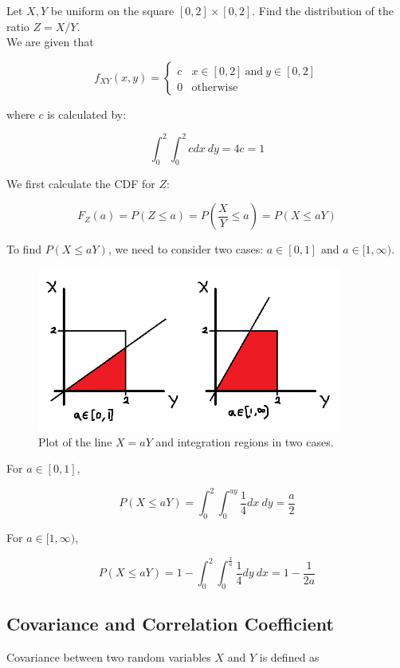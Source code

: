 \begin{texample}
	Let $X,Y$ be uniform on the square $[0,2]\times[0,2]$. Find the distribution of the ratio $Z=X/Y$. \\
	
	We are given that
	
	\[f_{XY}(x,y)=\begin{cases} c & x\in[0,2]\:\text{and}\:y\in[0,2] \\ 0 & \text{otherwise} \end{cases}\]
	
	where $c$ is calculated by:
	
	\[\int_0^2\int_0^2 c dx\:dy=4c=1\]
	
	We first calculate the CDF for $Z$:
	
	\[F_Z(a)=P(Z\le a)=P\left(\frac{X}{Y}\le a\right)=P(X\le aY)\]
	
	To find $P(X\le aY)$, we need to consider two cases: $a\in[0,1]$ and $a\in[1,\infty)$.
	
	\begin{figure}[H]
		\centering
		\includegraphics[width=100mm]{34.png}
		\caption{Plot of the line $X=aY$ and integration regions in two cases.}
	\end{figure}
	
	For $a\in[0,1]$,
	
	\[P(X\le aY)=\int_0^2\int_0^{ay} \frac14 dx\:dy=\frac{a}{2}\]
	
	For $a\in[1,\infty)$,
	
	\[P(X\le aY)=1-\int_0^2\int_0^{\frac{x}{a}} \frac14 dy\:dx=1-\frac{1}{2a}\]
	
\end{texample}

\subsection{Covariance and Correlation Coefficient}

Covariance between two random variables $X$ and $Y$ is defined as

